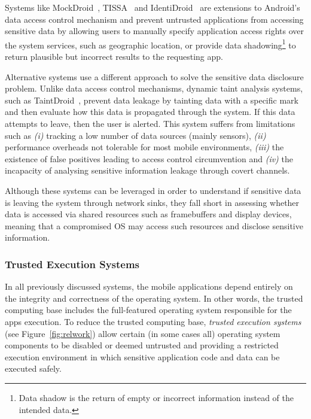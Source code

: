 Systems like MockDroid~\cite{beresford2011mockdroid}, TISSA~\cite{zhou2011taming} and IdentiDroid~\cite{shebaro2014identidroid} are extensions to Android's data access control mechanism and prevent untrusted applications from accessing sensitive data by allowing users to manually specify application access rights over the system services, such as geographic location, or provide data shadowing\footnote{Data shadow is the return of empty or incorrect information instead of the intended data.} to return plausible but incorrect results to the requesting app.

Alternative systems use a different approach to solve the sensitive data disclosure problem. Unlike data access control mechanisms, dynamic taint analysis systems, such as TaintDroid~\cite{enck2014taintdroid}, prevent data leakage by tainting data with a specific mark and then evaluate how this data is propagated through the system. If this data attempts to leave, then the user is alerted. This system suffers from limitations such as \emph{(i)} tracking a low number of data sources (mainly sensors), \emph{(ii)} performance overheads not tolerable for most mobile environments, \emph{(iii)} the existence of false positives leading to access control circumvention and \emph{(iv)} the incapacity of analysing sensitive information leakage through covert channels.

Although these systems can be leveraged in order to understand if sensitive data is leaving the system through network sinks, they fall short in assessing whether data is accessed via shared resources such as framebuffers and display devices, meaning that a compromised OS may access such resources and disclose sensitive information.

\subsubsection{Trusted Execution Systems}
\label{sec:tee}

In all previously discussed systems, the mobile applications depend entirely on the integrity and correctness of the operating system. In other words, the trusted computing base includes the full-featured operating system responsible for the apps execution. To reduce the trusted computing base, \emph{trusted execution systems} (see Figure~\ref{fig:relwork}) allow certain (in some cases all) operating system components to be disabled or deemed untrusted and providing a restricted execution environment in which sensitive application code and data can be executed safely.

